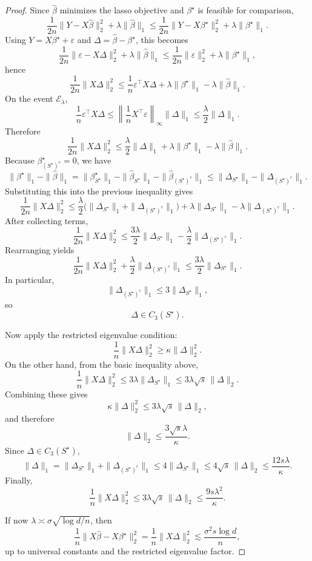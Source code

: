 \begin{proof}
Since \(\hat\beta\) minimizes the lasso objective and \(\beta^\star\) is feasible for comparison,
\[
\frac{1}{2n}\|Y-X\hat\beta\|_2^2+\lambda\|\hat\beta\|_1
\le
\frac{1}{2n}\|Y-X\beta^\star\|_2^2+\lambda\|\beta^\star\|_1.
\]
Using \(Y=X\beta^\star+\varepsilon\) and \(\Delta=\hat\beta-\beta^\star\), this becomes
\[
\frac{1}{2n}\|\varepsilon-X\Delta\|_2^2+\lambda\|\hat\beta\|_1
\le
\frac{1}{2n}\|\varepsilon\|_2^2+\lambda\|\beta^\star\|_1,
\]
hence
\[
\frac{1}{2n}\|X\Delta\|_2^2
\le
\frac{1}{n}\varepsilon^\top X\Delta+\lambda\|\beta^\star\|_1-\lambda\|\hat\beta\|_1.
\]
On the event \(\mathcal E_\lambda\),
\[
\frac{1}{n}\varepsilon^\top X\Delta
\le
\left\|\frac{1}{n}X^\top\varepsilon\right\|_\infty \|\Delta\|_1
\le
\frac{\lambda}{2}\|\Delta\|_1.
\]
Therefore
\[
\frac{1}{2n}\|X\Delta\|_2^2
\le
\frac{\lambda}{2}\|\Delta\|_1+\lambda\|\beta^\star\|_1-\lambda\|\hat\beta\|_1.
\]
Because \(\beta^\star_{(S^\star)^c}=0\), we have
\[
\|\beta^\star\|_1-\|\hat\beta\|_1
=
\|\beta^\star_{S^\star}\|_1-\|\hat\beta_{S^\star}\|_1-\|\hat\beta_{(S^\star)^c}\|_1
\le
\|\Delta_{S^\star}\|_1-\|\Delta_{(S^\star)^c}\|_1.
\]
Substituting this into the previous inequality gives
\[
\frac{1}{2n}\|X\Delta\|_2^2
\le
\frac{\lambda}{2}\bigl(\|\Delta_{S^\star}\|_1+\|\Delta_{(S^\star)^c}\|_1\bigr)
+\lambda\|\Delta_{S^\star}\|_1
-\lambda\|\Delta_{(S^\star)^c}\|_1.
\]
After collecting terms,
\[
\frac{1}{2n}\|X\Delta\|_2^2
\le
\frac{3\lambda}{2}\|\Delta_{S^\star}\|_1
-
\frac{\lambda}{2}\|\Delta_{(S^\star)^c}\|_1.
\]
Rearranging yields
\[
\frac{1}{2n}\|X\Delta\|_2^2
+
\frac{\lambda}{2}\|\Delta_{(S^\star)^c}\|_1
\le
\frac{3\lambda}{2}\|\Delta_{S^\star}\|_1.
\]
In particular,
\[
\|\Delta_{(S^\star)^c}\|_1\le 3\|\Delta_{S^\star}\|_1,
\]
so
\[
\Delta\in C_3(S^\star).
\]

Now apply the restricted eigenvalue condition:
\[
\frac{1}{n}\|X\Delta\|_2^2\ge \kappa \|\Delta\|_2^2.
\]
On the other hand, from the basic inequality above,
\[
\frac{1}{n}\|X\Delta\|_2^2
\le
3\lambda \|\Delta_{S^\star}\|_1
\le
3\lambda \sqrt{s}\,\|\Delta\|_2.
\]
Combining these gives
\[
\kappa \|\Delta\|_2^2
\le
3\lambda \sqrt{s}\,\|\Delta\|_2,
\]
and therefore
\[
\|\Delta\|_2 \le \frac{3\sqrt{s}\lambda}{\kappa}.
\]
Since \(\Delta\in C_3(S^\star)\),
\[
\|\Delta\|_1
=
\|\Delta_{S^\star}\|_1+\|\Delta_{(S^\star)^c}\|_1
\le
4\|\Delta_{S^\star}\|_1
\le
4\sqrt{s}\,\|\Delta\|_2
\le
\frac{12 s\lambda}{\kappa}.
\]
Finally,
\[
\frac{1}{n}\|X\Delta\|_2^2
\le
3\lambda \sqrt{s}\,\|\Delta\|_2
\le
\frac{9 s\lambda^2}{\kappa}.
\]

If now \(\lambda\asymp \sigma \sqrt{\log d/n}\), then
\[
\frac{1}{n}\|X\hat\beta-X\beta^\star\|_2^2
=
\frac{1}{n}\|X\Delta\|_2^2
\lesssim
\frac{\sigma^2 s\log d}{n},
\]
up to universal constants and the restricted eigenvalue factor.
\end{proof}

